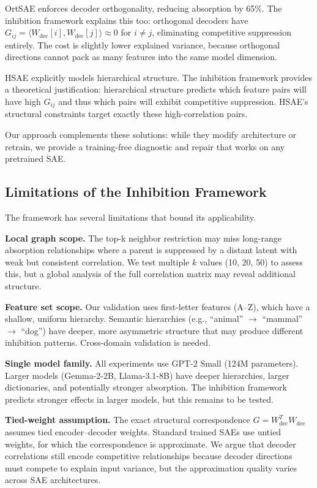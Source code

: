 \documentclass{article}
\begin{document}
OrtSAE \citep{korznikov2025ort} enforces decoder orthogonality, reducing absorption by 65\%. The inhibition framework explains this too: orthogonal decoders have $G_{ij} = \langle W_{\text{dec}}[i], W_{\text{dec}}[j] \rangle \approx 0$ for $i \neq j$, eliminating competitive suppression entirely. The cost is slightly lower explained variance, because orthogonal directions cannot pack as many features into the same model dimension.

HSAE \citep{luo2026hsae} explicitly models hierarchical structure. The inhibition framework provides a theoretical justification: hierarchical structure predicts which feature pairs will have high $G_{ij}$ and thus which pairs will exhibit competitive suppression. HSAE's structural constraints target exactly these high-correlation pairs.

Our approach complements these solutions: while they modify architecture or retrain, we provide a training-free diagnostic and repair that works on any pretrained SAE.

\subsection{Limitations of the Inhibition Framework}

The framework has several limitations that bound its applicability.

\textbf{Local graph scope.} The top-k neighbor restriction may miss long-range absorption relationships where a parent is suppressed by a distant latent with weak but consistent correlation. We test multiple $k$ values (10, 20, 50) to assess this, but a global analysis of the full correlation matrix may reveal additional structure.

\textbf{Feature set scope.} Our validation uses first-letter features (A--Z), which have a shallow, uniform hierarchy. Semantic hierarchies (e.g., ``animal'' $\rightarrow$ ``mammal'' $\rightarrow$ ``dog'') have deeper, more asymmetric structure that may produce different inhibition patterns. Cross-domain validation is needed.

\textbf{Single model family.} All experiments use GPT-2 Small (124M parameters). Larger models (Gemma-2-2B, Llama-3.1-8B) have deeper hierarchies, larger dictionaries, and potentially stronger absorption. The inhibition framework predicts stronger effects in larger models, but this remains to be tested.

\textbf{Tied-weight assumption.} The exact structural correspondence $G = W_{\text{dec}}^T W_{\text{dec}}$ assumes tied encoder--decoder weights. Standard trained SAEs use untied weights, for which the correspondence is approximate. We argue that decoder correlations still encode competitive relationships because decoder directions must compete to explain input variance, but the approximation quality varies across SAE architectures.
\end{document}
